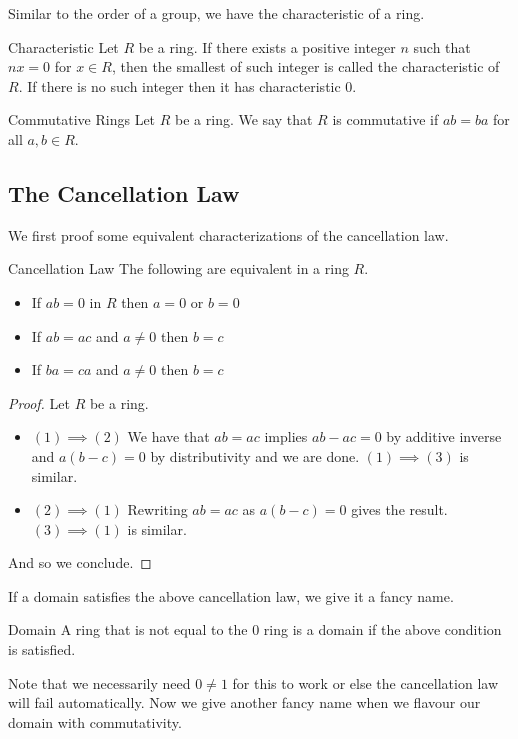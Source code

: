 \documentclass[a4paper]{article}
\begin{document}
Similar to the order of a group, we have the characteristic of a ring. 

\begin{defn}{Characteristic}{} Let $R$ be a ring. If there exists a positive integer $n$ such that $nx=0$ for $x\in R$, then the smallest of such integer is called the characteristic of $R$. If there is no such integer then it has characteristic $0$. 
\end{defn}

\begin{defn}{Commutative Rings}{} Let $R$ be a ring. We say that $R$ is commutative if $ab=ba$ for all $a,b\in R$. 
\end{defn}

\subsection{The Cancellation Law}
We first proof some equivalent characterizations of the cancellation law. 
\begin{prp}{Cancellation Law}{} The following are equivalent in a ring $R$. 
\begin{itemize}
\item If $ab=0$ in $R$ then $a=0$ or $b=0$
\item If $ab=ac$ and $a\neq 0$ then $b=c$
\item If $ba=ca$ and $a\neq 0$ then $b=c$
\end{itemize}
\begin{proof}
Let $R$ be a ring. 
\begin{itemize}
\item $(1)\implies(2)$ We have that $ab=ac$ implies $ab-ac=0$ by additive inverse and $a(b-c)=0$ by distributivity and we are done. $(1)\implies(3)$ is similar. 
\item $(2)\implies(1)$ Rewriting $ab=ac$ as $a(b-c)=0$ gives the result. $(3)\implies(1)$ is similar. 
\end{itemize}
And so we conclude. 
\end{proof}
\end{prp}

If a domain satisfies the above cancellation law, we give it a fancy name. 

\begin{defn}{Domain}{} A ring that is not equal to the $0$ ring is a domain if the above condition is satisfied. 
\end{defn}

Note that we necessarily need $0\neq 1$ for this to work or else the cancellation law will fail automatically. Now we give another fancy name when we flavour our domain with commutativity. 
\end{document}
